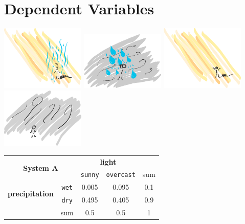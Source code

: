 \section{Dependent Variables}

\includegraphics[width=0.3\textwidth]{img/sun-rain}
\includegraphics[width=0.3\textwidth]{img/cloud-rain}
\includegraphics[width=0.3\textwidth]{img/sun}
\includegraphics[width=0.3\textwidth]{img/cloud}

\begin{center}
 \begin{tabular}{c c || c | c || c}
 \multicolumn{2}{c}{\multirow{2}{*}{\textbf{System A}}} & \multicolumn{2}{c}{\textbf{light}} & {}\\
\multicolumn{2}{c}{} & \texttt{sunny} & \texttt{overcast} & sum \\ [0.5ex]
 \hline\hline
\multirow{2}{*}{\textbf{precipitation}} & \texttt{wet} & 0.005 & 0.095 & 0.1 \\
 \cline{2-5}
 & \texttt{dry} & 0.495 & 0.405 & 0.9 \\
 \hline\hline
  {} & sum & 0.5 & 0.5 & 1 \\ [1ex]
\end{tabular}
\end{center}


